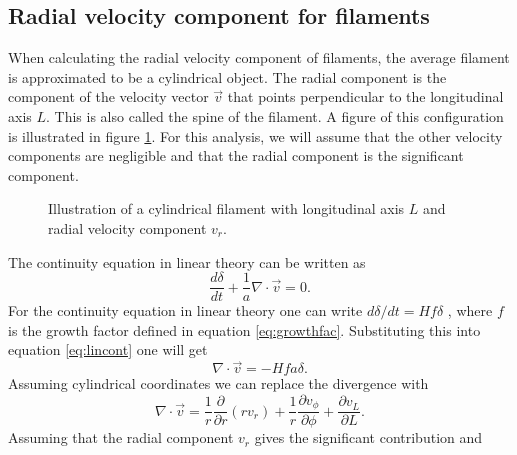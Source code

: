 \subsection{Radial velocity component for filaments}\label{sec:filamentvr}
When calculating the radial velocity component of filaments, the average filament is
approximated to be a cylindrical object. The radial component is the component of
the velocity vector $\vec{v}$ that points perpendicular to the longitudinal axis
$L$. This is also called the spine of the filament. A figure of this configuration is illustrated in figure \ref{fig:filamentvr}. For this analysis, we
will assume that the other velocity components are negligible and that the
radial component is the significant component.
\begin{figure}
    \begin{center}
    \end{center}
    \caption{Illustration of a cylindrical filament with longitudinal axis $L$ and radial velocity component $v_r$.}
    \label{fig:filamentvr}
\end{figure}
The continuity equation in linear theory can be written as
\begin{equation}\label{eq:lincont}
    \frac{d\delta}{dt}+\frac{1}{a}\nabla\cdot\vec{v}=0.
\end{equation}
For the continuity equation in linear theory one can write
 $d\delta/dt=Hf\delta$ \cite[p.~347]{schneider2006extragalactic}, where $f$ is the growth factor
defined in equation \ref{eq:growthfac}. Substituting this into equation
\ref{eq:lincont} one will get
\begin{equation}\label{eq:templineq}
    \nabla\cdot\vec{v}=-Hfa\delta.
\end{equation}
Assuming cylindrical coordinates we can replace the
divergence with
\begin{equation}
    \nabla\cdot\vec{v}=\frac{1}{r}\frac{\partial}{\partial r}(rv_r)+\frac{1}{r}\frac{\partial v_\phi}{\partial \phi} +\frac{\partial v_L}{\partial L}.
\end{equation}
Assuming that the radial component $v_r$ gives the significant contribution and
